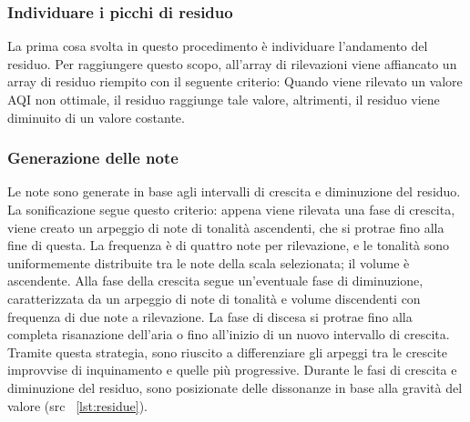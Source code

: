 \subsubsection{Individuare i picchi di residuo}
La prima cosa svolta in questo procedimento è individuare l'andamento del residuo.
Per raggiungere questo scopo, all'array di rilevazioni viene affiancato un array di residuo riempito con il seguente criterio:
Quando viene rilevato un valore AQI non ottimale, il residuo raggiunge tale valore, altrimenti, il residuo viene diminuito di un valore costante.
\subsubsection{Generazione delle note}
Le note sono generate in base agli intervalli di crescita e diminuzione del residuo.
La sonificazione segue questo criterio: appena viene rilevata una fase di crescita, viene creato un arpeggio di note di tonalità ascendenti, che si protrae fino alla fine di questa.
La frequenza è di quattro note per rilevazione, e le tonalità sono uniformemente distribuite tra le note della scala selezionata; il volume è ascendente.
Alla fase della crescita segue un'eventuale fase di diminuzione, caratterizzata da un arpeggio di note di tonalità e volume discendenti con frequenza di due note a rilevazione. La fase
di discesa si protrae fino alla completa risanazione dell'aria o fino all'inizio di un nuovo intervallo di crescita.
Tramite questa strategia, sono riuscito a differenziare gli arpeggi tra le crescite improvvise di inquinamento e quelle più progressive.
Durante le fasi di crescita e diminuzione del residuo, sono posizionate delle dissonanze in base alla gravità del valore (src ~\ref{lst:residue}).

\newpage

